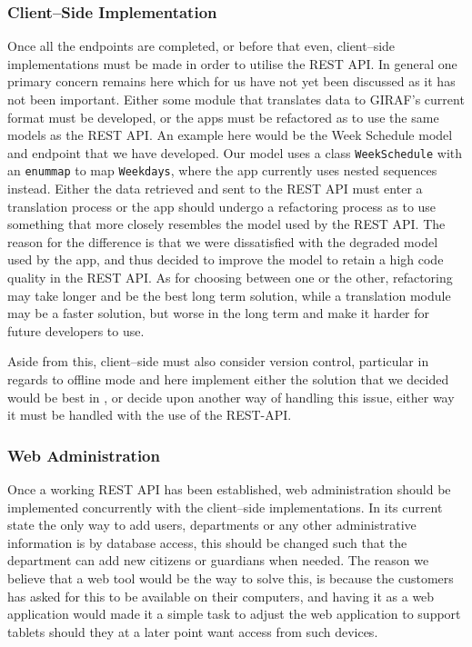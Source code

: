 \subsubsection*{Client--Side Implementation}
Once all the endpoints are completed, or before that even, client--side implementations must be made in order to utilise the REST API.
In general one primary concern remains here which for us have not yet been discussed as it has not been important.
Either some module that translates data to GIRAF's current format must be developed, or the apps must be refactored as to use the same models as the REST API.
An example here would be the Week Schedule model and endpoint that we have developed.
Our model uses a class \texttt{WeekSchedule} with an \texttt{enummap} to map \texttt{Weekdays}, where the app currently uses nested sequences instead.
Either the data retrieved and sent to the REST API must enter a translation process or the app should undergo a refactoring process as to use something that more closely resembles the model used by the REST API.
The reason for the difference is that we were dissatisfied with the degraded model used by the app, and thus decided to improve the model to retain a high code quality in the REST API.
As for choosing between one or the other, refactoring may take longer and be the best long term solution, while a translation module may be a faster solution, but worse in the long term and make it harder for future developers to use.

Aside from this, client--side must also consider version control, particular in regards to offline mode and here implement either the solution that we decided would be best in , or decide upon another way of handling this issue, either way it must be handled with the use of the REST-API.

\subsubsection*{Web Administration}
Once a working REST API has been established, web administration should be implemented concurrently with the client--side implementations.
In its current state the only way to add users, departments or any other administrative information is by database access, this should be changed such that the department can add new citizens or guardians when needed.
The reason we believe that a web tool would be the way to solve this, is because the customers has asked for this to be available on their computers, and having it as a web application would made it a simple task to adjust the web application to support tablets should they at a later point want access from such devices.

